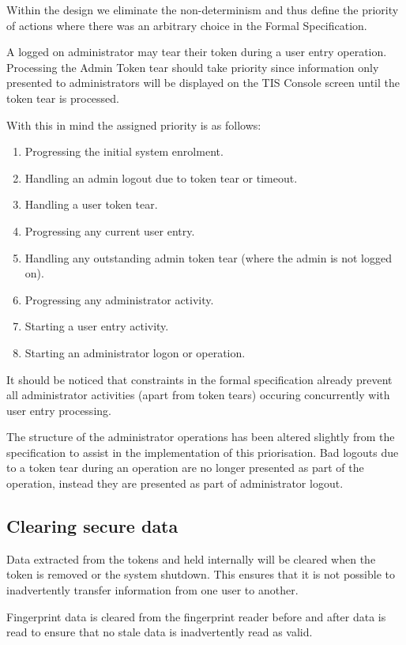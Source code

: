 Within the design we eliminate the non-determinism and thus define the
priority of actions where there was an arbitrary choice in the Formal
Specification.

A logged on administrator may tear their token during a user entry
operation. Processing 
the Admin Token tear should take priority since information only
presented to administrators will be displayed on the TIS Console screen
until the token tear is processed.

With this in mind the assigned priority is as follows:

\begin{enumerate}
\item Progressing the initial system enrolment.
\item Handling an admin logout due to token tear or timeout.
\item Handling a user token tear.
\item Progressing any current user entry.
\item Handling any outstanding admin token tear (where the admin is
not logged on).
\item Progressing any administrator activity.
\item Starting a user entry activity.
\item Starting an administrator logon or operation.
\end{enumerate}
 
It should be noticed that constraints in the formal specification
already prevent all administrator activities (apart from token tears)
occuring concurrently with user entry processing.

The structure of the administrator operations has been altered
slightly from the specification to assist in the implementation of this
priorisation. Bad logouts due to a token tear during an operation are
no longer presented as part of the operation, instead they are
presented as part of administrator logout.

\subsection{Clearing secure data}
Data extracted from the tokens and held internally will be cleared
when the token is removed or the system shutdown. This ensures that it
is not possible to inadvertently transfer information from one user to
another. 

Fingerprint data is cleared from the fingerprint reader before and
after data is read to ensure that no stale data is inadvertently read
as valid.

